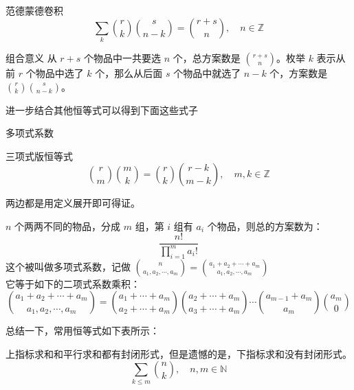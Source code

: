 \documentclass[UTF8]{beamer}
\begin{document}
    \begin{frame}
        \begin{block}{范德蒙德卷积}\vspace{-1em}
            $$
            \sum_{k}\binom{r}{k}\binom{s}{n-k}=\binom{r+s}{n},\quad n\in\mathbb Z
            $$\vspace{-1em}
        \end{block}
        \pause
        \begin{block}{组合意义}
            从 $r+s$ 个物品中一共要选 $n$ 个，总方案数是 $\binom{r+s}{n}$。枚举 $k$ 表示从前 $r$ 个物品中选了 $k$ 个，那么从后面 $s$ 个物品中就选了 $n-k$ 个，方案数是 $\binom{r}{k}\binom{s}{n-k}$。
        \end{block}
        \pause
        进一步结合其他恒等式可以得到下面这些式子
    \end{frame}

    \begin{frame}{多项式系数}
        \begin{block}{三项式版恒等式}
            $$
            \binom{r}{m}\binom{m}{k}=\binom{r}{k}\binom{r-k}{m-k},\quad m,k\in \mathbb Z
            $$
        \end{block}
        两边都是用定义展开即可得证。

        \pause

        $n$ 个两两不同的物品，分成 $m$ 组，第 $i$ 组有 $a_i$ 个物品，则总的方案数为：
        $$\frac{n!}{\prod_{i=1}^ma_i!}$$
        \pause
        这个被叫做多项式系数，记做 $\binom{n}{a_1,a_2,\cdots,a_m}=\binom{a_1+a_2+\cdots+a_m}{a_1,a_2,\cdots,a_m}$\\
        \pause
        它等于如下的二项式系数乘积：
        $$\binom{a_1+a_2+\cdots+a_m}{a_1,a_2,\cdots,a_m}=\binom{a_1+\cdots+a_m}{a_2+\cdots+a_m}\binom{a_2+\cdots+a_m}{a_3+\cdots+a_m}\cdots\binom{a_{m-1}+a_m}{a_m}\binom{a_m}0$$
    \end{frame}

    \begin{frame}
        总结一下，常用恒等式如下表所示：
    \end{frame}

    \begin{frame}
        上指标求和和平行求和都有封闭形式，但是遗憾的是，下指标求和没有封闭形式。
        $$
        \sum_{k\le m}\binom{n}{k},\quad n,m\in \mathbb N
        $$
    \end{frame}
\end{document}
